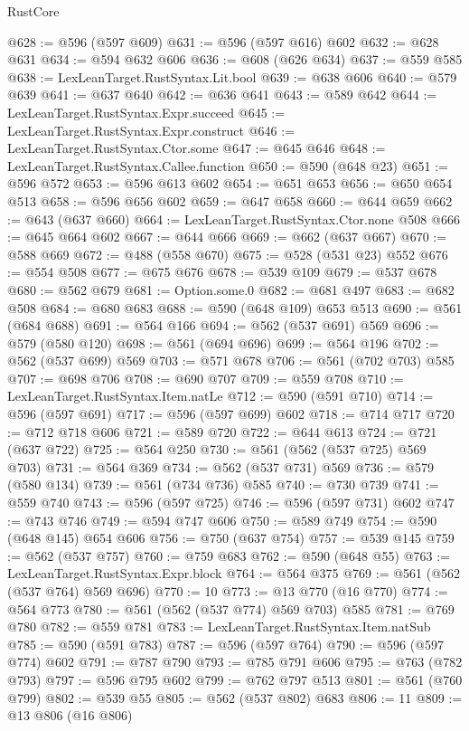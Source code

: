 \begin{lexlean}{RustCore}
\begin{coremodule}
@628 := @596 (@597 @609)
@631 := @596 (@597 @616) @602
@632 := @628 @631
@634 := @594 @632 @606
@636 := @608 (@626 @634)
@637 := @559 @585
@638 := LexLeanTarget.RustSyntax.Lit.bool
@639 := @638 @606
@640 := @579 @639
@641 := @637 @640
@642 := @636 @641
@643 := @589 @642
@644 := LexLeanTarget.RustSyntax.Expr.succeed
@645 := LexLeanTarget.RustSyntax.Expr.construct
@646 := LexLeanTarget.RustSyntax.Ctor.some
@647 := @645 @646
@648 := LexLeanTarget.RustSyntax.Callee.function
@650 := @590 (@648 @23)
@651 := @596 @572
@653 := @596 @613 @602
@654 := @651 @653
@656 := @650 @654 @513
@658 := @596 @656 @602
@659 := @647 @658
@660 := @644 @659
@662 := @643 (@637 @660)
@664 := LexLeanTarget.RustSyntax.Ctor.none @508
@666 := @645 @664 @602
@667 := @644 @666
@669 := @662 (@637 @667)
@670 := @588 @669
@672 := @488 (@558 @670)
@675 := @528 (@531 @23) @552
@676 := @554 @508
@677 := @675 @676
@678 := @539 @109
@679 := @537 @678
@680 := @562 @679
@681 := Option.some.{0}
@682 := @681 @497
@683 := @682 @508
@684 := @680 @683
@688 := @590 (@648 @109) @653 @513
@690 := @561 (@684 @688)
@691 := @564 @166
@694 := @562 (@537 @691) @569
@696 := @579 (@580 @120)
@698 := @561 (@694 @696)
@699 := @564 @196
@702 := @562 (@537 @699) @569
@703 := @571 @678
@706 := @561 (@702 @703) @585
@707 := @698 @706
@708 := @690 @707
@709 := @559 @708
@710 := LexLeanTarget.RustSyntax.Item.natLe
@712 := @590 (@591 @710)
@714 := @596 (@597 @691)
@717 := @596 (@597 @699) @602
@718 := @714 @717
@720 := @712 @718 @606
@721 := @589 @720
@722 := @644 @613
@724 := @721 (@637 @722)
@725 := @564 @250
@730 := @561 (@562 (@537 @725) @569 @703)
@731 := @564 @369
@734 := @562 (@537 @731) @569
@736 := @579 (@580 @134)
@739 := @561 (@734 @736) @585
@740 := @730 @739
@741 := @559 @740
@743 := @596 (@597 @725)
@746 := @596 (@597 @731) @602
@747 := @743 @746
@749 := @594 @747 @606
@750 := @589 @749
@754 := @590 (@648 @145) @654 @606
@756 := @750 (@637 @754)
@757 := @539 @145
@759 := @562 (@537 @757)
@760 := @759 @683
@762 := @590 (@648 @55)
@763 := LexLeanTarget.RustSyntax.Expr.block
@764 := @564 @375
@769 := @561 (@562 (@537 @764) @569 @696)
@770 := 10
@773 := @13 @770 (@16 @770)
@774 := @564 @773
@780 := @561 (@562 (@537 @774) @569 @703) @585
@781 := @769 @780
@782 := @559 @781
@783 := LexLeanTarget.RustSyntax.Item.natSub
@785 := @590 (@591 @783)
@787 := @596 (@597 @764)
@790 := @596 (@597 @774) @602
@791 := @787 @790
@793 := @785 @791 @606
@795 := @763 (@782 @793)
@797 := @596 @795 @602
@799 := @762 @797 @513
@801 := @561 (@760 @799)
@802 := @539 @55
@805 := @562 (@537 @802) @683
@806 := 11
@809 := @13 @806 (@16 @806)

\end{coremodule}
\end{lexlean}

